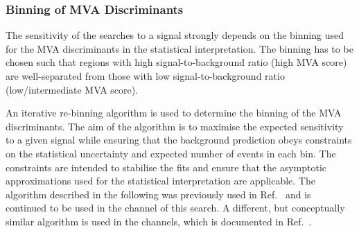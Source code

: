 

\subsubsection{Binning of MVA Discriminants}%
\label{sec:binning_alg}

The sensitivity of the searches to a signal strongly depends on the binning used
for the MVA discriminants in the statistical interpretation. The binning has to
be chosen such that regions with high signal-to-background ratio (high MVA
score) are well-separated from those with low signal-to-background ratio
(low/intermediate MVA score).

An iterative re-binning algorithm is used to determine the binning of the MVA
discriminants. The aim of the algorithm is to maximise the expected sensitivity
to a given signal while ensuring that the background prediction obeys
constraints on the statistical uncertainty and expected number of events in each
bin. The constraints are intended to stabilise the fits and ensure that the
asymptotic approximations used for the statistical interpretation are
applicable. The algorithm described in the following was previously used in
Ref.~\cite{HIGG-2016-16-witherratum} and is continued to be used in the \hadhad
channel of this search. A different, but conceptually similar algorithm is used
in the \lephad channels, which is documented in Ref.~\cite{HDBS-2018-40}.


